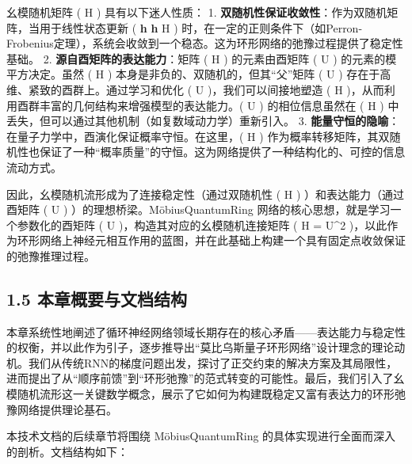 \documentclass[
  12pt,
]{article}
\begin{document}
幺模随机矩阵 ( H ) 具有以下迷人性质： 1.
\textbf{双随机性保证收敛性}：作为双随机矩阵，当用于线性状态更新 (
\textbf{h} \leftarrow \textbf{h} H )
时，在一定的正则条件下（如Perron-Frobenius定理），系统会收敛到一个稳态。这为环形网络的弛豫过程提供了稳定性基础。
2. \textbf{源自酉矩阵的表达能力}：矩阵 ( H ) 的元素由酉矩阵 ( U )
的元素的模平方决定。虽然 ( H ) 本身是非负的、双随机的，但其``父''矩阵 (
U ) 存在于高维、紧致的酉群上。通过学习和优化 ( U )，我们可以间接地塑造 (
H )，从而利用酉群丰富的几何结构来增强模型的表达能力。( U )
的相位信息虽然在 ( H )
中丢失，但可以通过其他机制（如复数域动力学）重新引入。 3.
\textbf{能量守恒的隐喻}：在量子力学中，酉演化保证概率守恒。在这里，( H )
作为概率转移矩阵，其双随机性也保证了一种``概率质量''的守恒。这为网络提供了一种结构化的、可控的信息流动方式。

因此，幺模随机流形成为了连接稳定性（通过双随机性 ( H )
）和表达能力（通过酉矩阵 ( U ) ）的理想桥梁。MöbiusQuantumRing
网络的核心思想，就是学习一个参数化的酉矩阵 ( U
)，构造其对应的幺模随机连接矩阵 ( H = \textbar U\textbar\^{}2
)，以此作为环形网络上神经元相互作用的蓝图，并在此基础上构建一个具有固定点收敛保证的弛豫推理过程。

\hypertarget{ux672cux7ae0ux6982ux8981ux4e0eux6587ux6863ux7ed3ux6784}{%
\subsection{1.5
本章概要与文档结构}\label{ux672cux7ae0ux6982ux8981ux4e0eux6587ux6863ux7ed3ux6784}}

本章系统性地阐述了循环神经网络领域长期存在的核心矛盾------表达能力与稳定性的权衡，并以此作为引子，逐步推导出``莫比乌斯量子环形网络''设计理念的理论动机。我们从传统RNN的梯度问题出发，探讨了正交约束的解决方案及其局限性，进而提出了从``顺序前馈''到``环形弛豫''的范式转变的可能性。最后，我们引入了幺模随机流形这一关键数学概念，展示了它如何为构建既稳定又富有表达力的环形弛豫网络提供理论基石。

本技术文档的后续章节将围绕 MöbiusQuantumRing
的具体实现进行全面而深入的剖析。文档结构如下：
\end{document}
